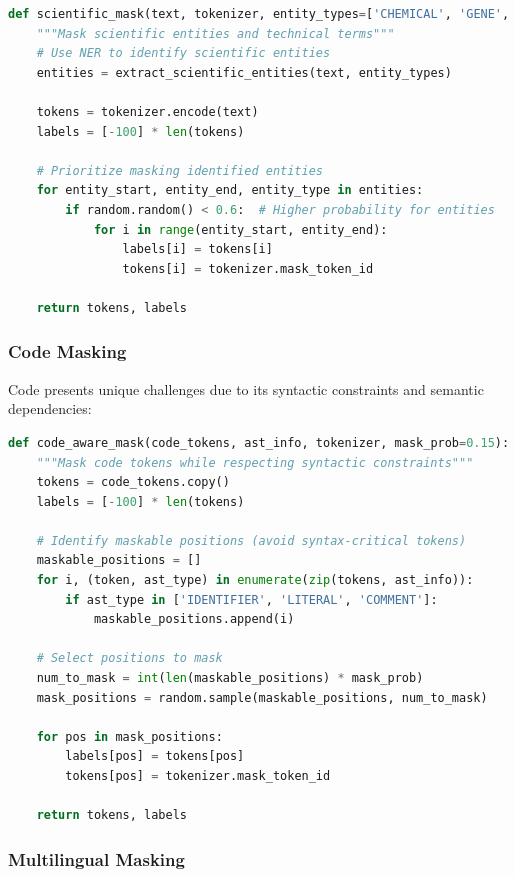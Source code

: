 \begin{lstlisting}[language=Python, caption=Scientific text masking]
def scientific_mask(text, tokenizer, entity_types=['CHEMICAL', 'GENE', 'DISEASE']):
    """Mask scientific entities and technical terms"""
    # Use NER to identify scientific entities
    entities = extract_scientific_entities(text, entity_types)
    
    tokens = tokenizer.encode(text)
    labels = [-100] * len(tokens)
    
    # Prioritize masking identified entities
    for entity_start, entity_end, entity_type in entities:
        if random.random() < 0.6:  # Higher probability for entities
            for i in range(entity_start, entity_end):
                labels[i] = tokens[i]
                tokens[i] = tokenizer.mask_token_id
    
    return tokens, labels
\end{lstlisting}

\subsubsection{Code Masking}

Code presents unique challenges due to its syntactic constraints and semantic dependencies:

\begin{lstlisting}[language=Python, caption=Code-aware masking]
def code_aware_mask(code_tokens, ast_info, tokenizer, mask_prob=0.15):
    """Mask code tokens while respecting syntactic constraints"""
    tokens = code_tokens.copy()
    labels = [-100] * len(tokens)
    
    # Identify maskable positions (avoid syntax-critical tokens)
    maskable_positions = []
    for i, (token, ast_type) in enumerate(zip(tokens, ast_info)):
        if ast_type in ['IDENTIFIER', 'LITERAL', 'COMMENT']:
            maskable_positions.append(i)
    
    # Select positions to mask
    num_to_mask = int(len(maskable_positions) * mask_prob)
    mask_positions = random.sample(maskable_positions, num_to_mask)
    
    for pos in mask_positions:
        labels[pos] = tokens[pos]
        tokens[pos] = tokenizer.mask_token_id
    
    return tokens, labels
\end{lstlisting}

\subsubsection{Multilingual Masking}

